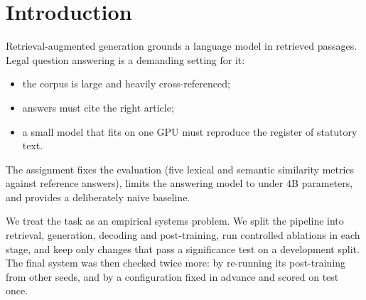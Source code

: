 \documentclass[11pt,a4paper]{article}
\begin{document}
\section{Introduction}
Retrieval-augmented generation \cite{lewis2020rag,rag_survey} grounds a language model in retrieved passages. Legal question answering is a demanding setting for it:
\begin{itemize}[leftmargin=*]
\item the corpus is large and heavily cross-referenced;
\item answers must cite the right article;
\item a small model that fits on one GPU must reproduce the register of statutory text.
\end{itemize}
The assignment fixes the evaluation (five lexical and semantic similarity metrics against reference answers), limits the answering model to under $4$B parameters, and provides a deliberately naive baseline.

We treat the task as an empirical systems problem. We split the pipeline into retrieval, generation, decoding and post-training, run controlled ablations in each stage, and keep only changes that pass a significance test on a development split. The final system was then checked twice more: by re-running its post-training from other seeds, and by a configuration fixed in advance and scored on test once.
\end{document}
